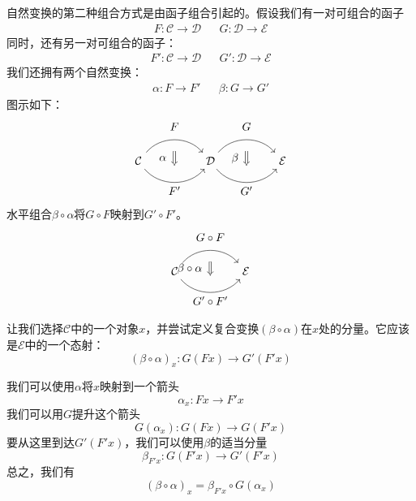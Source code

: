 \documentclass[DaoFP]{subfiles}
\begin{document}
    自然变换的第二种组合方式是由函子组合引起的。假设我们有一对可组合的函子
    \begin{align*}
        F \colon \mathcal{C} \to \mathcal{D}
        &&G \colon \mathcal{D} \to \mathcal{E}
    \end{align*}
    同时，还有另一对可组合的函子：
    \begin{align*}
        F' \colon \mathcal{C} \to \mathcal{D}
        && G' \colon \mathcal{D} \to \mathcal{E}
    \end{align*}
    我们还拥有两个自然变换：
    \begin{align*}
        \alpha \colon F \to F'
        && \beta \colon G \to G'
    \end{align*}
    图示如下：
    \[
        \begin{tikzcd}[column sep=huge]
            \mathcal{C}
            \arrow[bend left=50]{r}[name=U, label=above:$F$]{}
            \arrow[bend right=50]{r}[name=D, label=below:$F'$]{}
            &
            \mathcal{D}
            \arrow[bend left=50]{r}[name=U1, label=above:$G$]{}
            \arrow[bend right=50]{r}[name=D1, label=below:$G'$]{}
            &
            \mathcal{E}
            \arrow[shorten <=10pt,shorten >=10pt,Rightarrow,to path={(U) -- node[label=left:$\alpha$] {} (D)}]{}
            \arrow[shorten <=10pt,shorten >=10pt,Rightarrow,to path={(U1) -- node[label=left:$\beta$] {} (D1)}]{}
        \end{tikzcd}
    \]
    水平组合$\beta \circ \alpha$将$G \circ F$映射到$G' \circ F'$。
    \[
        \begin{tikzcd}[column sep=huge]
            \mathcal{C}
            \arrow[bend left=50]{r}[name=U, label=above:$G \circ F$]{}
            \arrow[bend right=50]{r}[name=D, label=below:$G' \circ F'$]{}
            &
            \mathcal{E}
            \arrow[shorten <=10pt,shorten >=10pt,Rightarrow,to path={(U) -- node[label=left:$\beta \circ \alpha$] {} (D)}]{}
        \end{tikzcd}
    \]

    让我们选择$\mathcal{C}$中的一个对象$x$，并尝试定义复合变换$(\beta \circ \alpha)$在$x$处的分量。它应该是$\mathcal{E}$中的一个态射：
    \[ (\beta \circ \alpha)_x \colon G ( F x) \to G' ( F' x) \]

    我们可以使用$\alpha$将$x$映射到一个箭头
    \[ \alpha_x \colon F x \to F' x \]
    我们可以用$G$提升这个箭头
    \[ G (\alpha_x) \colon G (F x) \to G (F' x) \]
    要从这里到达$G' (F' x)$，我们可以使用$\beta$的适当分量
    \[ \beta_{F' x} \colon G (F' x) \to G' (F' x) \]
    总之，我们有
    \[ (\beta \circ \alpha)_x = \beta_{F' x} \circ G (\alpha_x) \]
\end{document}
